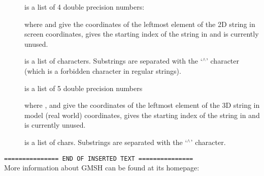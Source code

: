 \begin{description}
\item[]
is a list of 4 double precision numbers:
\begin{fileformat}
   
\end{fileformat}
where  and  give the coordinates of the leftmost
element of the 2D string in screen coordinates,  gives the
starting index of the string in  and  is
currently unused.

\item[]
is a list of  characters. Substrings are separated with
the `$^\wedge$' character (which is a forbidden character in regular strings).

\item[]
is a list of 5 double precision numbers
\begin{fileformat}
    
\end{fileformat}
where ,  and  give the coordinates of
the leftmost element of the 3D string in model (real world) coordinates,
 gives the starting index of the string in  and
 is currently unused.

\item[]
is a list of  chars. Substrings are separated with the
`$^\wedge$' character.
\end{description}
 
{\tt =============== END OF INSERTED TEXT ===============}\\[0.5em]

More information about GMSH can be found at its homepage:\\
\\

